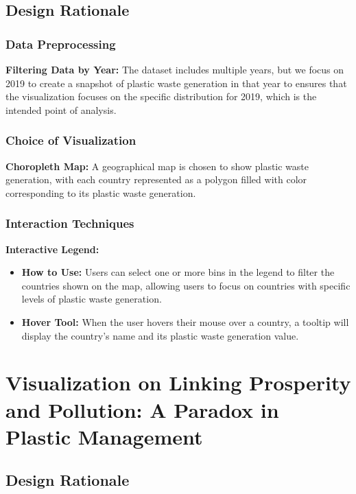 \documentclass{article}
\begin{document}
\subsection{Design Rationale}

\subsubsection{Data Preprocessing}
\textbf{Filtering Data by Year:} The dataset includes multiple years, but we focus on 2019 to create a snapshot of plastic waste generation in that year to ensures that the visualization focuses on the specific distribution for 2019, which is the intended point of analysis.

\subsubsection{Choice of Visualization}
\textbf{Choropleth Map:} A geographical map is chosen to show plastic waste generation, with each country represented as a polygon filled with color corresponding to its plastic waste generation.

\subsubsection{Interaction Techniques}
\textbf{Interactive Legend:}
\begin{itemize}
    \item \textbf{How to Use:} Users can select one or more bins in the legend to filter the countries shown on the map, allowing users to focus on countries with specific levels of plastic waste generation.
    \item \textbf{Hover Tool:} When the user hovers their mouse over a country, a tooltip will display the country’s name and its plastic waste generation value.
\end{itemize}

\section{Visualization on Linking Prosperity and Pollution: A Paradox in Plastic Management}

\subsection{Design Rationale}
\end{document}
